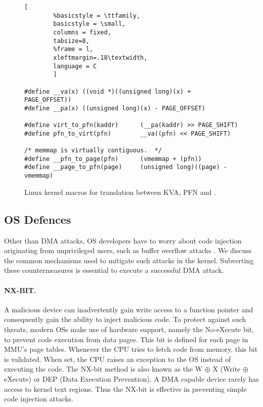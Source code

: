 
\begin{figure*}[t]
                \begin{lstlisting}[
        %basicstyle = \ttfamily,
        basicstyle = \small,
        columns = fixed,
        tabsize=8,
        %frame = l,
        xleftmargin=.18\textwidth,
        language = C
        ]
        
#define __va(x) ((void *)((unsigned long)(x) + PAGE_OFFSET))
#define __pa(x) ((unsigned long)(x) - PAGE_OFFSET)

#define virt_to_pfn(kaddr)      (__pa(kaddr) >> PAGE_SHIFT)
#define pfn_to_virt(pfn)        __va((pfn) << PAGE_SHIFT)

/* memmap is virtually contiguous.  */
#define __pfn_to_page(pfn)      (vmemmap + (pfn))  
#define __page_to_pfn(page)     (unsigned long)((page) - vmemmap)
                \end{lstlisting}
        \caption{ Linux kernel macros for translation between KVA, PFN and \page{}.
                }
        \label{fig:mem_model}
\end{figure*}

\subsection{OS Defences}

Other than DMA attacks, OS developers have to worry about code injection originating from unprivileged users, such as buffer overflow attacks \cite{nx, kalsr}.
We discuss the common mechanisms used to mitigate such attacks in the kernel. Subverting these countermeasures is essential to execute a successful DMA attack.

\paragraph{NX-BIT.}\label{sec:nx-bit}

A malicious device can inadvertently gain write access to a function pointer and consequently gain the ability to inject malicious code. 
To protect against such threats, modern OSs make use of hardware support, namely the No-eXecute bit, to prevent code execution from data pages. This bit is defined for each page in MMU’s page tables. Whenever the CPU tries to fetch code from memory, this bit is validated. When set, the CPU raises an exception to the OS instead of executing the code. The NX-bit method is also known as the W $\oplus$ X (Write $\oplus$ eXecute) or DEP (Data Execution Prevention). 
A DMA capable device rarely has access to kernel text regions. Thus the NX-bit is effective in preventing simple code injection attacks.

